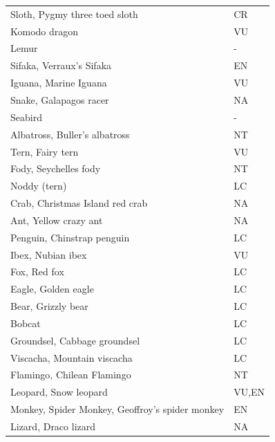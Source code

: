 \documentclass[12pt,letterpaper]{article}
\begin{document}
\begin{center}
\begin{longtable}{ll}
Sloth, Pygmy three toed sloth                   & CR          \\
Komodo dragon                                   & VU          \\
Lemur                                           &  -           \\
Sifaka, Verraux's Sifaka                        & EN          \\
Iguana, Marine Iguana                           & VU          \\
Snake, Galapagos racer                          & NA          \\
Seabird                                         & -           \\
Albatross, Buller's albatross                   & NT          \\
Tern, Fairy tern                                & VU          \\
Fody, Seychelles fody                           & NT          \\
Noddy (tern)                                    & LC          \\
Crab, Christmas Island red crab                 & NA          \\
Ant, Yellow crazy ant                           & NA          \\
Penguin, Chinstrap penguin                      & LC          \\
Ibex, Nubian ibex                               & VU          \\
Fox, Red fox                                    & LC          \\
Eagle, Golden eagle                             & LC          \\
Bear, Grizzly bear                              & LC          \\
Bobcat                                          & LC          \\
Groundsel, Cabbage groundsel                    & LC          \\
Viscacha, Mountain viscacha                     & LC          \\
Flamingo, Chilean Flamingo                      & NT          \\
Leopard, Snow leopard                           & VU,EN       \\
Monkey, Spider Monkey, Geoffroy's spider monkey & EN          \\
Lizard, Draco lizard                            & NA          \\

\end{longtable}
\end{center}
\end{document}
